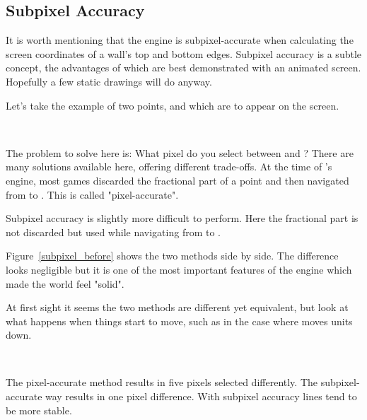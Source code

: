 \subsection{Subpixel Accuracy}
It is worth mentioning that the engine is subpixel-accurate when calculating the screen coordinates of a wall's top and bottom edges. Subpixel accuracy is a subtle concept, the advantages of which are best demonstrated with an animated screen. Hopefully a few static drawings will do anyway.\\
\par
 Let's take the example of two points,  and  which are to appear on the screen.\\
 \par
{}\\
\par
The problem to solve here is: What pixel do you select between  and ? There are many solutions available here, offering different trade-offs. At the time of \doom{}'s engine, most games discarded the fractional part of a point and then navigated from  to . This is called "pixel-accurate".\\
\par
Subpixel accuracy is slightly more difficult to perform. Here the fractional part is not discarded but used while navigating from  to .\\
\par
Figure~\ref{subpixel_before} shows the two methods side by side. The difference looks negligible but it is one of the most important features of the engine which made the world feel "solid".
\\
\par
At first sight it seems the two methods are different yet equivalent, but look at what happens when things start to move, such as in the case where  moves  units down.\\
\par
{}\\
\par
The pixel-accurate method results in five pixels selected differently. The subpixel-accurate way results in one pixel difference. With subpixel accuracy lines tend to be more stable.\\
\par 








